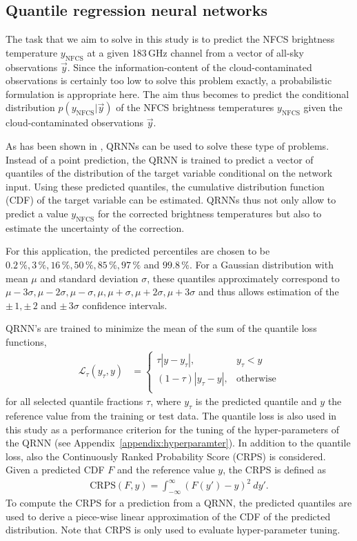 \documentclass[amt, manuscript]{copernicus}
\newcommand{\ynfcs}{y_\text{NFCS}}
\newcommand{\y}{\vec{y}}
\begin{document}
\subsection{Quantile regression neural networks}
\label{sec:QRNN}
%
The task that we aim to solve in this study is to predict the NFCS brightness
temperature $\ynfcs$ at a given 183\,GHz channel from a vector of
all-sky observations $\y$. Since the information-content of the
cloud-contaminated observations is certainly too low to solve this problem
exactly, a probabilistic formulation is appropriate here. The aim thus becomes
to predict the conditional distribution $p(\ynfcs | \y)$ of the NFCS brightness
temperatures $\ynfcs$ given the cloud-contaminated observations $\y$.

As has been shown in \citet{pfreundschuh:aneur:18}, QRNNs can be used to solve
these type of problems. Instead of a point prediction, the QRNN is trained to
predict a vector of quantiles of the distribution of the target variable
conditional on the network input. Using these predicted quantiles, the cumulative
distribution function (CDF) of the target variable can be estimated. QRNNs thus
not only allow to predict a value $\ynfcs$ for the corrected brightness temperatures
but also to estimate the uncertainty of the correction.

For this application, the predicted percentiles are chosen to be
$0.2\,\%, 3\,\%, 16\,\%, 50\,\%, 85\,\%, 97\,\%$ and $99.8\,\%$. For a Gaussian
distribution with mean $\mu$ and standard deviation $\sigma$, these quantiles
approximately correspond to $\mu -3\sigma, \mu-2\sigma, \mu-\sigma
, \mu, \mu + \sigma, \mu + 2\sigma, \mu + 3\sigma$ and thus allows
estimation of the $\pm\, 1, \pm\, 2$ and $\pm\, 3\sigma$ confidence intervals.

QRNN's are trained to minimize the mean of the sum of the quantile loss functions,
%
\begin{align}
\mathcal{L}_\tau(y_\tau, y) &=
\begin{cases}
\tau|y - y_\tau|, & y_\tau < y \\ (1 - \tau)|y_\tau - y|, & \text{otherwise}
\\
\end{cases}
\end{align}
%
for all selected quantile fractions $\tau$, where $y_\tau$ is the predicted
quantile and $y$ the reference value from the training or test data. The
quantile loss is also used in this study as a performance criterion for the tuning of
the hyper-parameters of the QRNN (see Appendix~\ref{appendix:hyperparamter}). In
addition to the quantile loss, also the Continuously Ranked Probability Score
(CRPS) is considered. Given a predicted CDF
$F$ and the reference value $y$, the CRPS is defined as
%
\begin{align}
\text{CRPS}(F, y) = \int_{-\infty}^{\infty} \left (F(y') - y\right )^2\: dy'.
\end{align}
%
To compute the CRPS for a prediction from a QRNN, the predicted quantiles are
used to derive a piece-wise linear approximation of the CDF of the predicted
distribution. Note that CRPS is only used to evaluate hyper-parameter tuning.
\end{document}
